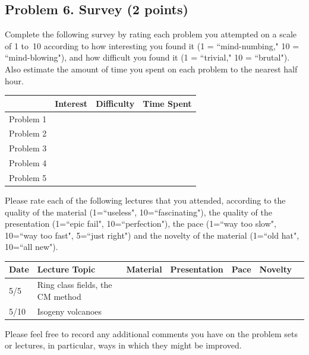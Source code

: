 \documentclass[11pt]{article}
\begin{document}
\subsection*{Problem 6. Survey (2 points)}

Complete the following survey by rating each problem you attempted on a scale of 1 to~10 according to how interesting you found it (1 = ``mind-numbing," 10 = ``mind-blowing"), and how difficult you found it (1 = ``trivial," 10 = ``brutal").  Also estimate the amount of time you spent on each problem to the nearest half hour.

\begin{center}
\begin{tabular}{l|r|r|r|}
& Interest & Difficulty & Time Spent\\\hline
Problem 1 & & & \\\hline
Problem 2 & & & \\\hline
Problem 3 & & & \\\hline
Problem 4 & & & \\\hline
Problem 5 & & & \\\hline
\end{tabular}
\end{center}
\noindent
Please rate each of the following lectures that you attended, according to the quality of the material (1=``useless", 10=``fascinating"), the quality of the presentation (1=``epic fail", 10=``perfection"), the pace (1=``way too slow", 10=``way too fast", 5=``just right") and the novelty of the material (1=``old hat", 10=``all new").

\begin{center}
\begin{tabular}{l|l|r|r|r|r|r}
Date & Lecture Topic & Material & Presentation & Pace & Novelty\\\hline
5/5 & Ring class fields, the CM method & & & & \\\hline 
5/10 & Isogeny volcanoes & & & & \\\hline 
\end{tabular}
\end{center}

\noindent
Please feel free to record any additional comments you have on the problem sets or lectures, in particular, ways in which they might be improved.
\end{document}
